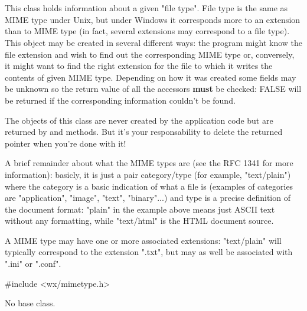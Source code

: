 \section{}\label{wxfiletype}

This class holds information about a given "file type". File type is the same as
MIME type under Unix, but under Windows it corresponds more to an extension than
to MIME type (in fact, several extensions may correspond to a file type). This
object may be created in several different ways: the program might know the file
extension and wish to find out the corresponding MIME type or, conversely, it
might want to find the right extension for the file to which it writes the
contents of given MIME type. Depending on how it was created some fields may be
unknown so the return value of all the accessors {\bf must} be checked: FALSE
will be returned if the corresponding information couldn't be found.

The objects of this class are never created by the application code but are
returned by  and 
 methods.
But it's your responsability to delete the returned pointer when you're done
with it!

A brief remainder about what the MIME types are (see the RFC 1341 for more
information): basicly, it is just a pair category/type (for example,
"text/plain") where the category is a basic indication of what a file is
(examples of categories are "application", "image", "text", "binary"...) and
type is a precise definition of the document format: "plain" in the example
above means just ASCII text without any formatting, while "text/html" is the
HTML document source.

A MIME type may have one or more associated extensions: "text/plain" will
typically correspond to the extension ".txt", but may as well be associated with
".ini" or ".conf".


#include <wx/mimetype.h>


No base class.




